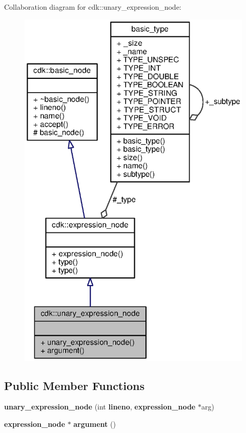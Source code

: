 Collaboration diagram for cdk\+:\+:unary\+\_\+expression\+\_\+node\+:
\nopagebreak
\begin{figure}[H]
\begin{center}
\leavevmode
\includegraphics[width=325pt]{classcdk_1_1unary__expression__node__coll__graph}
\end{center}
\end{figure}
\subsection*{Public Member Functions}
\begin{DoxyCompactItemize}
\item 
{\bfseries unary\+\_\+expression\+\_\+node} (int {\bf lineno}, {\bf expression\+\_\+node} $\ast$arg)\label{classcdk_1_1unary__expression__node_ae8b80218d68be7ff2c876ad24dc63a3d}

\item 
{\bf expression\+\_\+node} $\ast$ {\bfseries argument} ()\label{classcdk_1_1unary__expression__node_ac0d970616c9475447bb6ab11669e18bf}

\end{DoxyCompactItemize}
